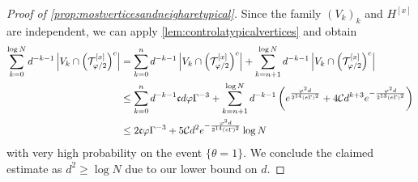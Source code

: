 \documentclass[11pt]{article}
\newcommand{\abs}[1]{\left| #1 \right|}
\newcommand{\ccc}{\mathfrak{c}}
\theoremstyle{plain}
\theoremstyle{remark}
\numberwithin{equation}{section}
\newcommand*\bset[1]{[#1]}
\newcommand{\nc}{\normalcolor}
\begin{document}
\begin{proof}[Proof of \cref{prop:mostverticesandneigharetypical}]
			Since the family $(V_k)_{k}$ and $H^{\bset{x}}$ are independent, we can apply \cref{lem:controlatypicalvertices} and obtain
		\begin{align*}
			\sum_{k=0}^{\log N} d^{-k-1}\abs{V_k \cap\left(\mathcal{T}^{\bset{x}}_{\varphi/2}\right)^c} &= \sum_{k=0}^{n} d^{-k-1}\abs{V_k \cap\left(\mathcal{T}^{\bset{x}}_{\varphi/2}\right)^c}  + \sum_{k=n+1}^{\log N} d^{-k-1}\abs{V_k \cap\left(\mathcal{T}^{\bset{x}}_{\varphi/2}\right)^c}  \\
			&\le \sum_{k=0}^{n} d^{-k-1} \ccc d\varphi\Gamma^{-3}  + \sum_{k=n+1}^{\log N} d^{-k-1}\left( e^{\frac{\varphi^2d}{2^{14} (e\Gamma)^2}}  + 4\mathcal C d^{k+3} e^{-\frac{\varphi^2d}{2^{13} (e\Gamma)^2}}\nc \right)\\
			&\le 2 \ccc \varphi\Gamma^{-3} +  5\mathcal{C}d^2e^{-\frac{\varphi^2d}{2^{14} (e\Gamma)^2}}\log N
		\end{align*}
		with very high probability on the event $\{ \theta =1 \}$. We conclude the claimed estimate as $d^2 \geq \log N$ due to our lower bound on $d$.
	\end{proof}

	
		
	
\end{document}
